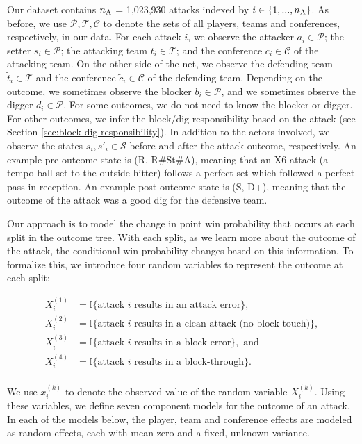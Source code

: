 \documentclass[USenglish]{article}
\theoremstyle{dgthm}
\theoremstyle{dgdef}
\begin{document}
Our dataset contains $n_{\mbox{\scriptsize A}}$ = 1,023,930 attacks indexed by $i \in \{1, ..., n_{\mbox{\scriptsize A}}\}$. As before, we use $\mathcal{P}, \mathcal{T}, \mathcal{C}$ to denote the sets of all players, teams and conferences, respectively, in our data. For each attack $i$, we observe the attacker $a_i \in \mathcal{P}$; the setter $s_i \in \mathcal{P}$; the attacking team $t_i \in \mathcal{T}$; and the conference $c_i \in \mathcal{C}$ of the attacking team. On the other side of the net, we observe the defending team $\tilde t_i \in \mathcal{T}$ and the conference $\tilde c_i \in \mathcal C$ of the defending team. Depending on the outcome, we sometimes observe the blocker $b_i \in \mathcal{P}$, and we sometimes observe the digger $d_i \in \mathcal{P}$. For some outcomes, we do not need to know the blocker or digger. For other outcomes, we infer the block/dig responsibility based on the attack (see Section \ref{sec:block-dig-responsibility}). In addition to the actors involved, we observe the states $s_i, s'_i \in \mathcal{S}$ before and after the attack outcome, respectively. An example pre-outcome state is (R, R\#St\#A), meaning that an X6 attack (a tempo ball set to the outside hitter) follows a perfect set which followed a perfect pass in reception. An example post-outcome state is (S, D+), meaning that the outcome of the attack was a good dig for the defensive team.

Our approach is to model the change in point win probability that occurs at each split in the outcome tree. With each split, as we learn more about the outcome of the attack, the conditional win probability changes based on this information. To formalize this, we introduce four random variables to represent the outcome at each split:

\begin{align*}
    X_i^{(1)} &= \mathbb{I}\{\text{attack $i$ results in an attack error}\},\\
    X_i^{(2)} &= \mathbb{I}\{\text{attack $i$ results in a clean attack (no block touch)}\},\\
    X_i^{(3)} &= \mathbb{I}\{\text{attack $i$ results in a block error}\},\mbox{ and}\\
    X_i^{(4)} &= \mathbb{I}\{\text{attack $i$ results in a block-through}\}.\\
\end{align*}

We use $x_i^{(k)}$ to denote the observed value of the random variable $X_i^{(k)}$. Using these variables, we define seven component models for the outcome of an attack. In each of the models below, the player, team and conference effects are modeled as random effects, each with mean zero and a fixed, unknown variance.\\
\end{document}
